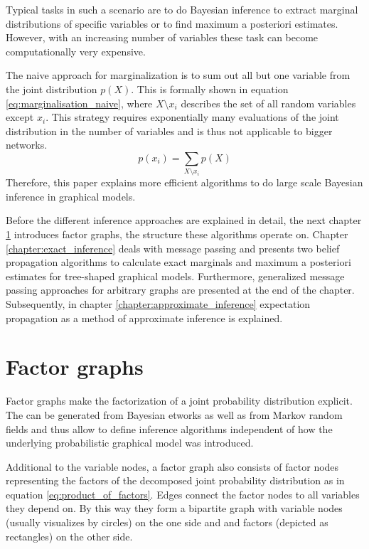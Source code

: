 \documentclass{sigkdd}
\begin{document}
Typical tasks in such a scenario are to do Bayesian inference to extract marginal distributions of specific variables or to find maximum a posteriori estimates. However, with an increasing number of variables these task can become computationally very expensive. 

The naive approach for marginalization is to sum out all but one variable from the joint distribution $p(X)$. This is formally shown in equation \ref{eq:marginalisation_naive}, where $X \setminus x_i$ describes the set of all random variables except $x_i$.
This strategy requires exponentially many evaluations of the joint distribution in the number of variables and is thus not applicable to bigger networks.
\begin{equation}\label{eq:marginalisation_naive}
p(x_i)= \sum_{X \setminus x_i} p(X)
\end{equation}
Therefore, this paper explains more efficient algorithms to do large scale Bayesian inference in graphical models. 

Before the different inference approaches are explained in detail, the next chapter \ref{chapter:fg} introduces factor graphs, the structure these algorithms operate on. Chapter \ref{chapter:exact_inference} deals with message passing and presents two belief propagation algorithms to calculate exact marginals and maximum a posteriori estimates for tree-shaped graphical models. Furthermore, generalized message passing approaches for arbitrary graphs are presented at the end of the chapter. Subsequently, in chapter \ref{chapter:approximate_inference} expectation propagation as a method of approximate inference is explained.

\section{Factor graphs}\label{chapter:fg}
Factor graphs make the factorization of a joint probability distribution explicit. The can be generated from Bayesian  etworks as well as from Markov random fields and thus allow to define inference algorithms independent of how the underlying probabilistic graphical model was introduced.

Additional to the variable nodes, a factor graph also consists of factor nodes representing the factors of the decomposed joint probability distribution as in equation  \ref{eq:product_of_factors}. Edges connect the factor nodes to all variables they depend on. By this way they form a bipartite graph with variable nodes (usually visualizes by circles) on the one side and and factors (depicted as rectangles) on the other side.
\end{document}

